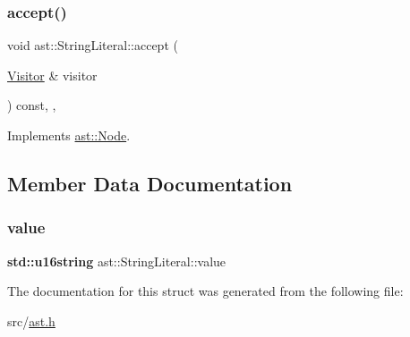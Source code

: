 \subsubsection{\texorpdfstring{accept()}{accept()}}
{\footnotesize\ttfamily void ast\+::\+String\+Literal\+::accept (\begin{DoxyParamCaption}\item[{\hyperlink{structast_1_1_visitor}{Visitor} \&}]{visitor }\end{DoxyParamCaption}) const\hspace{0.3cm}{\ttfamily [inline]}, {\ttfamily [override]}, {\ttfamily [virtual]}}



Implements \hyperlink{structast_1_1_node_abc089ee6caaf06a4445ebdd8391fdebc}{ast\+::\+Node}.



\subsection{Member Data Documentation}
\mbox{\label{structast_1_1_string_literal_ae29e252908fc00142e9b79371795a2e5}} 
\subsubsection{\texorpdfstring{value}{value}}
{\footnotesize\ttfamily \textbf{ std\+::u16string} ast\+::\+String\+Literal\+::value}



The documentation for this struct was generated from the following file\+:\begin{DoxyCompactItemize}
\item 
src/\hyperlink{ast_8h}{ast.\+h}\end{DoxyCompactItemize}
